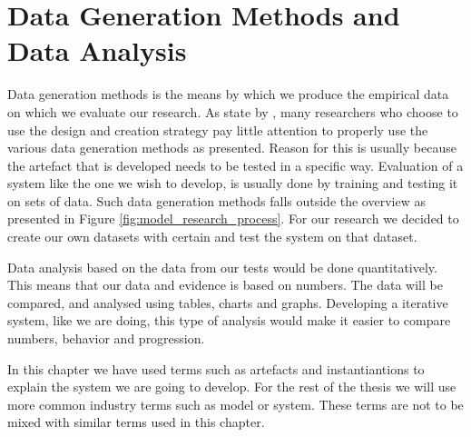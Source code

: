 
\section{Data Generation Methods and Data Analysis}
\label{sec:data_generation_methods_and_data_analysis}
Data generation methods is the means by which we produce the empirical data on which we evaluate our research. As state by \citep{oates2005researching}, many researchers who choose to use the design and creation strategy pay little attention to properly use the various data generation methods as presented. Reason for this is usually because the artefact that is developed needs to be tested in a specific way. Evaluation of a system like the one we wish to develop, is usually done by training and testing it on sets of data. Such data generation methods falls outside the overview as presented in Figure \ref{fig:model_research_process}. For our research we decided to create our own datasets with certain  and test the system on that dataset.

Data analysis based on the data from our tests would be done quantitatively. This means that our data and evidence is based on numbers. The data will be compared, and analysed using tables, charts and graphs. Developing a iterative system, like we are doing, this type of analysis would make it easier to compare numbers, behavior and progression.

\vspace{5mm}
\begin{note}
    In this chapter we have used terms such as artefacts and instantiantions to explain the system we are going to develop. For the rest of the thesis we will use more common industry terms such as model or system. These terms are not to be mixed with similar terms used in this chapter. 
\end{note}